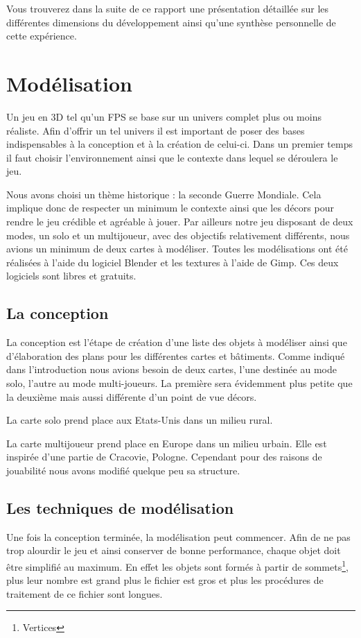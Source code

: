 \documentclass[11pt]{report}
\begin{document}
Vous trouverez dans la suite de ce rapport une présentation détaillée sur les différentes dimensions du développement ainsi qu'une synthèse personnelle de cette expérience.

\chapter{Modélisation}

Un jeu en 3D tel qu'un FPS se base sur un univers complet plus ou moins réaliste. Afin d'offrir un tel univers il est important de poser des bases indispensables à la conception et à la création de celui-ci. Dans un premier temps il faut choisir l’environnement ainsi que le contexte dans lequel se déroulera le jeu.

Nous avons choisi un thème historique : la seconde Guerre Mondiale. Cela implique donc de respecter un minimum le contexte ainsi que les décors pour rendre le jeu crédible et agréable à jouer. Par ailleurs notre jeu disposant de deux modes, un solo et un multijoueur, avec des objectifs relativement différents, nous avions un minimum de deux cartes à modéliser.  Toutes les modélisations ont été réalisées à l’aide du logiciel Blender et les textures à l’aide de Gimp.  Ces deux logiciels sont libres et gratuits.

\section{La conception}

La conception est l’étape de création d’une liste des objets à modéliser ainsi que d’élaboration des plans pour les différentes cartes et bâtiments. Comme indiqué dans l’introduction nous avions besoin de deux cartes, l’une destinée au mode solo, l’autre au mode multi-joueurs. La première sera évidemment plus petite que la deuxième mais aussi différente d’un point de vue décors.

La carte solo prend place aux Etats-Unis dans un milieu rural.

La carte multijoueur prend place en Europe dans un milieu urbain. Elle est inspirée d’une partie de Cracovie, Pologne. Cependant pour des raisons de jouabilité nous avons modifié quelque peu sa structure.

\section{Les techniques de modélisation}

Une fois la conception terminée, la modélisation peut commencer. Afin de ne pas trop alourdir le jeu et ainsi conserver de bonne performance, chaque objet doit être simplifié au maximum. En effet les objets sont formés à partir de sommets\footnote{Vertices}, plus leur nombre est grand plus le fichier est gros et plus les procédures de traitement de ce fichier sont longues.
\end{document}
